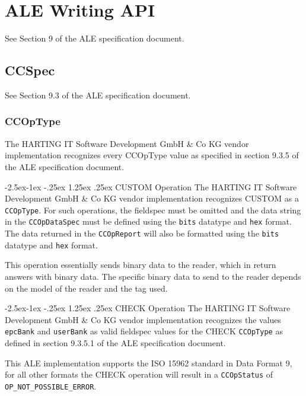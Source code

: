 \documentclass[11pt,a4paper,oneside]{article}
\makeatletter
\newif\ifincludecc
\renewcommand\paragraph{\@startsection{paragraph}{4}{\z@}%
            {-2.5ex\@plus -1ex \@minus -.25ex}%
            {1.25ex \@plus .25ex}%
            {\normalfont\normalsize\bfseries}}
\makeatother
\begin{document}
\ifincludecc
\section{ALE Writing API}
See Section 9 of the ALE specification document.

\subsection{CCSpec}
See Section 9.3 of the ALE specification document.

\subsubsection{CCOpType}
The HARTING IT Software Development GmbH \& Co KG vendor implementation recognizes every CCOpType value as specified in section 9.3.5 of the ALE specification document.

\paragraph{CUSTOM Operation}
The HARTING IT Software Development GmbH \& Co KG vendor implementation recognizes CUSTOM as a \texttt{CCOpType}. For such operations, the fieldspec must be omitted and the data string in the \texttt{CCOpDataSpec} must be defined using the \texttt{bits} datatype and \texttt{hex} format. The data returned in the \texttt{CCOpReport} will also be formatted using the \texttt{bits} datatype and \texttt{hex} format.

This operation essentially sends binary data to the reader, which in return answers with binary data. The specific binary data to send to the reader depends on the model of the reader and the tag used.

\paragraph{CHECK Operation}
The HARTING IT Software Development GmbH \& Co KG vendor implementation recognizes the values \texttt{epcBank} and \texttt{userBank} as valid fieldspec values for the CHECK \texttt{CCOpType} as defined in section 9.3.5.1 of the ALE specification document. 

This ALE implementation supports the ISO 15962 standard in Data Format 9, for all other formats the CHECK operation will result in a \texttt{CCOpStatus} of\\ \texttt{OP\_NOT\_POSSIBLE\_ERROR}.
\end{document}
